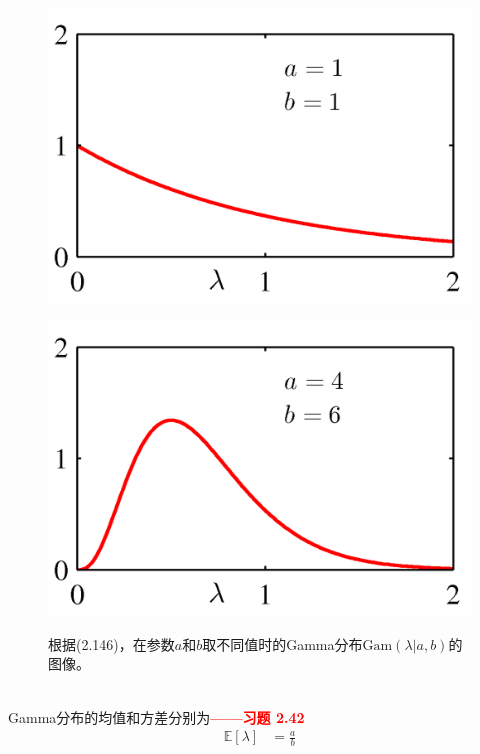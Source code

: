 \documentclass[b5paper]{book}
\numberwithin{equation}{chapter}
\begin{document}
{\begin{figure}[ht]
\begin{minipage}[t]{0.3\linewidth}
		\label{fig:2-13a}
		\end{minipage}
		\begin{minipage}[t]{0.3\linewidth}
		\centering
		\includegraphics[scale=0.8]{Images/2-13b.png}
		\label{fig:2-13b}
		\end{minipage}
		\begin{minipage}[t]{0.3\linewidth}
		\centering
		\includegraphics[scale=0.8]{Images/2-13c.png}
		\label{fig:2-13c}
		\end{minipage}
		\caption{根据(2.146)，在参数$a$和$b$取不同值时的Gamma分布$\mathrm{Gam}(\lambda|a,b)$的图像。}
	\end{figure}
	\\
	\indent Gamma分布的均值和方差分别为\textcolor{red}{\textbf{——习题 2.42}}
	\begin{align}
		\mathbb{E}[\lambda] &= \frac{a}{b}\\

\end{align}}
\end{document}
